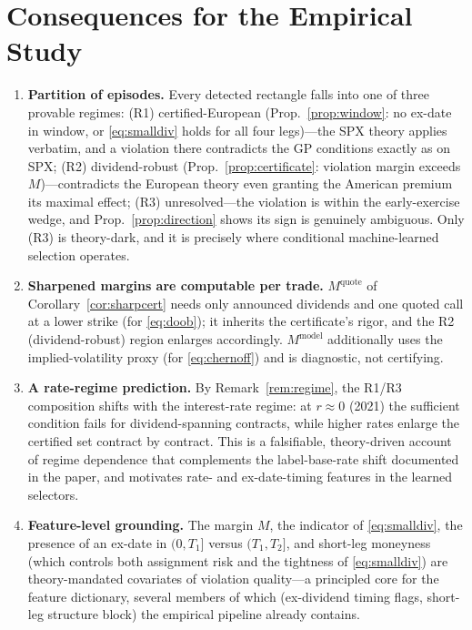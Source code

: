 \documentclass[11pt]{article}
\theoremstyle{remark}
\begin{document}
\section{Consequences for the Empirical Study}
\begin{enumerate}[leftmargin=1.4em,itemsep=1pt]
\item \textbf{Partition of episodes.} Every detected rectangle falls into one of three provable regimes: (R1) certified-European (Prop.~\ref{prop:window}: no ex-date in window, or \eqref{eq:smalldiv} holds for all four legs)---the SPX theory applies verbatim, and a violation there contradicts the GP conditions exactly as on SPX; (R2) dividend-robust (Prop.~\ref{prop:certificate}: violation margin exceeds $M$)---contradicts the European theory even granting the American premium its maximal effect; (R3) unresolved---the violation is within the early-exercise wedge, and Prop.~\ref{prop:direction} shows its sign is genuinely ambiguous. Only (R3) is theory-dark, and it is precisely where conditional machine-learned selection operates.
\item \textbf{Sharpened margins are computable per trade.} $M^{\mathrm{quote}}$ of Corollary~\ref{cor:sharpcert} needs only announced dividends and one quoted call at a lower strike (for \eqref{eq:doob}); it inherits the certificate's rigor, and the R2 (dividend-robust) region enlarges accordingly. $M^{\mathrm{model}}$ additionally uses the implied-volatility proxy (for \eqref{eq:chernoff}) and is diagnostic, not certifying.
\item \textbf{A rate-regime prediction.} By Remark~\ref{rem:regime}, the R1/R3 composition shifts with the interest-rate regime: at $r\approx0$ (2021) the sufficient condition fails for dividend-spanning contracts, while higher rates enlarge the certified set contract by contract. This is a falsifiable, theory-driven account of regime dependence that complements the label-base-rate shift documented in the paper, and motivates rate- and ex-date-timing features in the learned selectors.
\item \textbf{Feature-level grounding.} The margin $M$, the indicator of \eqref{eq:smalldiv}, the presence of an ex-date in $(0,T_1]$ versus $(T_1,T_2]$, and short-leg moneyness (which controls both assignment risk and the tightness of \eqref{eq:smalldiv}) are theory-mandated covariates of violation quality---a principled core for the feature dictionary, several members of which (ex-dividend timing flags, short-leg structure block) the empirical pipeline already contains.
\end{enumerate}
\end{document}
